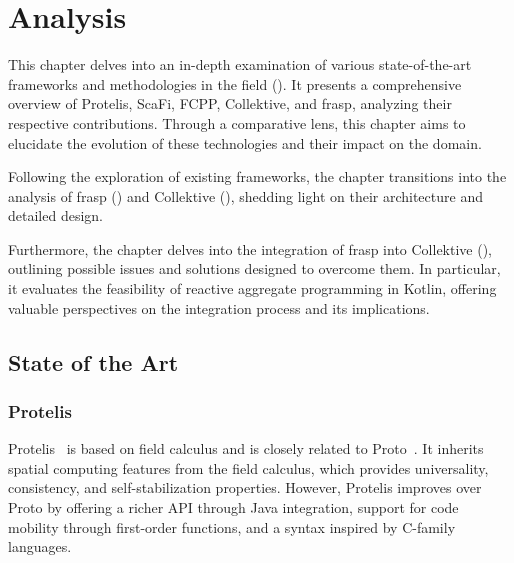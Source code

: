 
\chapter{Analysis}
\label{chap:analysis}

This chapter delves into an in-depth examination of various state-of-the-art frameworks and methodologies in the field (). It presents a comprehensive overview of Protelis, ScaFi, FCPP, Collektive, and \ac{frasp}, analyzing their respective contributions. Through a comparative lens, this chapter aims to elucidate the evolution of these technologies and their impact on the domain.

Following the exploration of existing frameworks, the chapter transitions into the analysis of \ac{frasp} () and Collektive (), shedding light on their architecture and detailed design.

Furthermore, the chapter delves into the integration of \ac{frasp} into Collektive (), outlining possible issues and solutions designed to overcome them. In particular, it evaluates the feasibility of reactive aggregate programming in Kotlin, offering valuable perspectives on the integration process and its implications.

\section{State of the Art}
\label{section:state-of-the-art}

\subsection{Protelis}

Protelis~\cite{Pianini2015} is based on field calculus and is closely related to Proto~\cite{Beal2006}. It inherits spatial computing features from the field calculus, which provides universality, consistency, and self-stabilization properties. However, Protelis improves over Proto by offering a richer API through Java integration, support for code mobility through first-order functions, and a syntax inspired by C-family languages.

